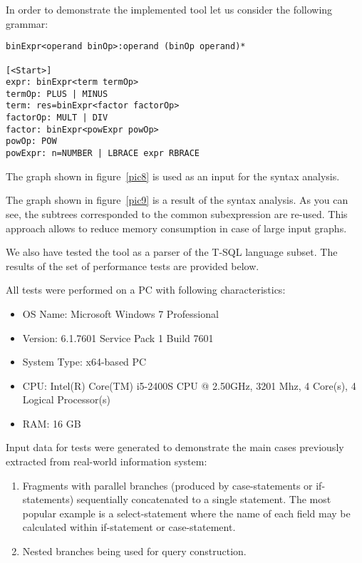 \documentclass{acm_proc_article-sp}
\begin{document}
In order to demonstrate the implemented tool let us consider the following grammar:

\begin{verbatim}
binExpr<operand binOp>:operand (binOp operand)*

[<Start>]
expr: binExpr<term termOp>
termOp: PLUS | MINUS
term: res=binExpr<factor factorOp>
factorOp: MULT | DIV
factor: binExpr<powExpr powOp>
powOp: POW
powExpr: n=NUMBER | LBRACE expr RBRACE

\end{verbatim}

The graph shown in figure~\ref{pic8} is used as an input for the syntax analysis.

\begin{figure*}
    \centering
    \caption{Input graph.}
    \label{pic8}
\end{figure*}

The graph shown in figure~\ref{pic9} is a result of the syntax analysis. As you can see, the subtrees corresponded to the common subexpression are re-used. This approach allows to reduce memory consumption in case of large input graphs.

\begin{figure*}
    \centering
    \caption{Result of the processing of the graph which presented in figure~\ref{pic8}.}
    \label{pic9}
\end{figure*}



We also have tested the tool as a parser of the T-SQL language subset. The results of the set of performance tests are provided below.

All tests were performed on a PC with following characteristics:
\begin{itemize}
\item OS Name: Microsoft Windows 7 Professional	
\item Version: 6.1.7601 Service Pack 1 Build 7601	
\item System Type: x64-based PC	
\item CPU: Intel(R) Core(TM) i5-2400S CPU @ 2.50GHz, 3201 Mhz, 4 Core(s), 4 Logical Processor(s)	
\item RAM: 16 GB
\end{itemize}

Input data for tests were generated to demonstrate the main cases previously extracted from real-world information system:
\begin{enumerate}
\item Fragments with parallel branches (produced by case-statements or if-statements) sequentially concatenated to a single statement. The most popular example is a select-statement where the name of each field may be calculated within if-statement or case-statement.
\item Nested branches being used for query construction.
\end{enumerate}
\end{document}
